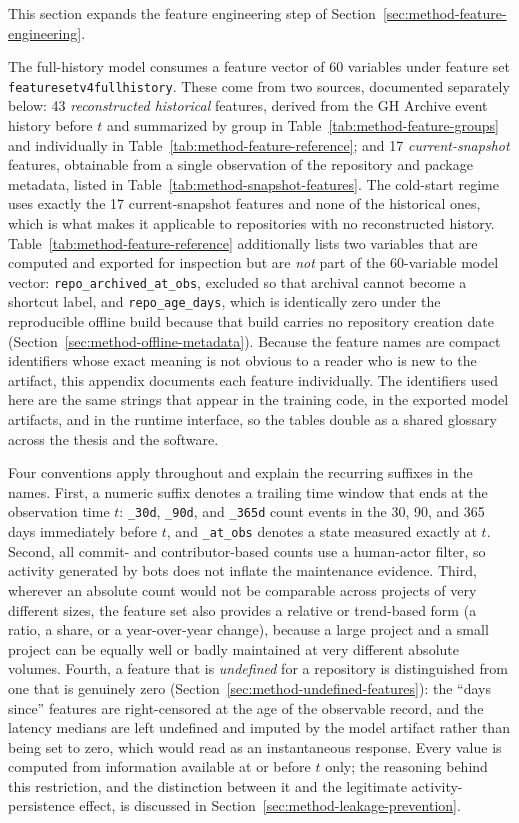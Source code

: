 This section expands the feature engineering step of Section~\ref{sec:method-feature-engineering}.

The full-history model consumes a feature vector of 60 variables under feature set \texttt{feature\sdash set\sdash v4\sdash full\sdash history}. These come from two sources, documented separately below: 43 \emph{reconstructed historical} features, derived from the GH Archive event history before \(t\) and summarized by group in Table~\ref{tab:method-feature-groups} and individually in Table~\ref{tab:method-feature-reference}; and 17 \emph{current-snapshot} features, obtainable from a single observation of the repository and package metadata, listed in Table~\ref{tab:method-snapshot-features}. The cold-start regime uses exactly the 17 current-snapshot features and none of the historical ones, which is what makes it applicable to repositories with no reconstructed history. Table~\ref{tab:method-feature-reference} additionally lists two variables that are computed and exported for inspection but are \emph{not} part of the 60-variable model vector: \texttt{repo\_archived\_at\_obs}, excluded so that archival cannot become a shortcut label, and \texttt{repo\_age\_days}, which is identically zero under the reproducible offline build because that build carries no repository creation date (Section~\ref{sec:method-offline-metadata}). Because the feature names are compact identifiers whose exact meaning is not obvious to a reader who is new to the artifact, this appendix documents each feature individually. The identifiers used here are the same strings that appear in the training code, in the exported model artifacts, and in the runtime interface, so the tables double as a shared glossary across the thesis and the software.

Four conventions apply throughout and explain the recurring suffixes in the names. First, a numeric suffix denotes a trailing time window that ends at the observation time \(t\): \texttt{\_30d}, \texttt{\_90d}, and \texttt{\_365d} count events in the 30, 90, and 365 days immediately before \(t\), and \texttt{\_at\_obs} denotes a state measured exactly at \(t\). Second, all commit- and contributor-based counts use a human-actor filter, so activity generated by bots does not inflate the maintenance evidence. Third, wherever an absolute count would not be comparable across projects of very different sizes, the feature set also provides a relative or trend-based form (a ratio, a share, or a year-over-year change), because a large project and a small project can be equally well or badly maintained at very different absolute volumes. Fourth, a feature that is \emph{undefined} for a repository is distinguished from one that is genuinely zero (Section~\ref{sec:method-undefined-features}): the ``days since'' features are right-censored at the age of the observable record, and the latency medians are left undefined and imputed by the model artifact rather than being set to zero, which would read as an instantaneous response. Every value is computed from information available at or before \(t\) only; the reasoning behind this restriction, and the distinction between it and the legitimate activity-persistence effect, is discussed in Section~\ref{sec:method-leakage-prevention}.

